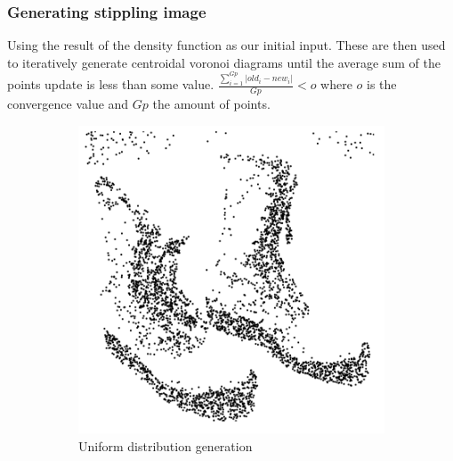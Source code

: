\subsubsection{Generating stippling image}
Using the result of the density function as our initial input. These are then used to iteratively generate centroidal voronoi diagrams until the average sum of the points update is less than some value. \(\frac{\sum_{i=1}^{Gp} | old_i - new_i |}{Gp} < o\) where \(o\) is the convergence value and \(Gp\) the amount of points.

\begin{figure}[!htb]
\begin{subfigure}[h]{0.4\linewidth}
\includegraphics[width=\linewidth]{images/uniform_distribution_shoes.png}
\caption{Uniform distribution generation}
\label{comparison-a}
\end{subfigure}
\hfill
\begin{subfigure}[h]{0.4\linewidth}

\end{subfigure}
\end{figure}
